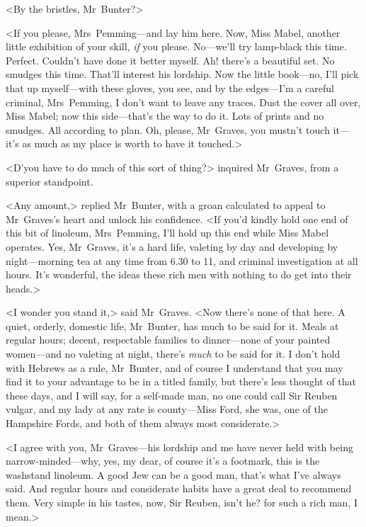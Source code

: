 <By the bristles, Mr~Bunter?>

<If you please, Mrs~Pemming—and lay him here. Now, Miss Mabel, another little exhibition of your skill, \textit{if} you please. No—we'll try lamp-black this time. Perfect. Couldn't have done it better myself. Ah! there's a beautiful set. No smudges this time. That'll interest his lordship. Now the little book—no, I'll pick that up myself—with these gloves, you see, and by the edges—I'm a careful criminal, Mrs~Pemming, I don't want to leave any traces. Dust the cover all over, Miss Mabel; now this side—that's the way to do it. Lots of prints and no smudges. All according to plan. Oh, please, Mr~Graves, you mustn't touch it—it's as much as my place is worth to have it touched.>

<D'you have to do much of this sort of thing?> inquired Mr~Graves, from a superior standpoint.

<Any amount,> replied Mr~Bunter, with a groan calculated to appeal to Mr~Graves's heart and unlock his confidence. <If you'd kindly hold one end of this bit of linoleum, Mrs~Pemming, I'll hold up this end while Miss Mabel operates. Yes, Mr~Graves, it's a hard life, valeting by day and developing by night—morning tea at any time from 6.30 to 11, and criminal investigation at all hours. It's wonderful, the ideas these rich men with nothing to do get into their heads.>

<I wonder you stand it,> said Mr~Graves. <Now there's none of that here. A quiet, orderly, domestic life, Mr~Bunter, has much to be said for it. Meals at regular hours; decent, respectable families to dinner—none of your painted women—and no valeting at night, there's \textit{much} to be said for it. I don't hold with Hebrews as a rule, Mr~Bunter, and of course I understand that you may find it to your advantage to be in a titled family, but there's less thought of that these days, and I will say, for a self-made man, no one could call Sir Reuben vulgar, and my lady at any rate is county—Miss Ford, she was, one of the Hampshire Fords, and both of them always most considerate.>

<I agree with you, Mr~Graves—his lordship and me have never held with being narrow-minded—why, yes, my dear, of course it's a footmark, this is the washstand linoleum. A good Jew can be a good man, that's what I've always said. And regular hours and considerate habits have a great deal to recommend them. Very simple in his tastes, now, Sir Reuben, isn't he? for such a rich man, I mean.>

